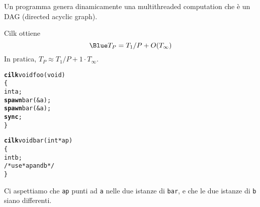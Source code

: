 \documentclass[times,sans-serif]{athenaslides}
\newcommand{\cilkkw}[1]{{\bf #1}}
\begin{document}
\begin{slide}
  Un programma genera dinamicamente una multithreaded computation
  che \`e un DAG (directed acyclic graph).


  \smallskip
  Cilk ottiene
  \[\Blue
                 T_P = T_1/P + O(T_\infty)
  \]
  In pratica, $T_P \approx T_1/P + 1\cdot T_\infty$.
\end{slide}
\begin{slide}
  \bigskip
  \begin{minipage}{.5\linewidth}\smaller
\begin{alltt}
\cilkkw{cilk} void foo(void)
\{
     int a;
     \cilkkw{spawn} bar(\&a);
     \cilkkw{spawn} bar(\&a);
     \cilkkw{sync};
\}

\cilkkw{cilk} void bar(int *ap)
\{
     int b;
     /* use *ap and b */
\}
\end{alltt}
\end{minipage}
\hfill
\begin{minipage}{.45\linewidth}\restoresize
  Ci aspettiamo che \texttt{ap} punti ad \texttt{a}
  nelle due istanze di \texttt{bar}, e che le due istanze di
  \texttt{b} siano differenti.

\end{minipage}
\end{slide}
\begin{slide}
  \bigskip
\end{slide}
\end{document}
